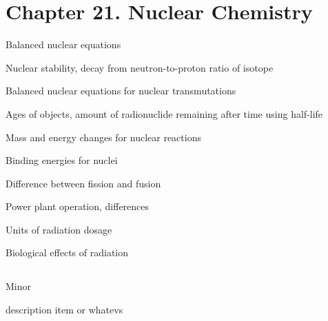 \section{Chapter 21. Nuclear Chemistry}

{\footnotesize
\begin{multicols}{3}
\begin{compactenum}
\item Balanced nuclear equations
\item Nuclear stability, decay from neutron-to-proton ratio of isotope
\item Balanced nuclear equations for nuclear transmutations
\item Ages of objects, amount of radionuclide remaining after time using
    half-life
\item  Mass and energy changes for nuclear reactions
\item  Binding energies for nuclei
\item  Difference between fission and fusion
\item  Power plant operation, differences
\item  Units of radiation dosage
\item  Biological effects of radiation
\end{compactenum}
\end{multicols}
}

\subsection{}
Minor
\begin{compactdesc}
    \item[description] item or whatevs
\end{compactdesc}
